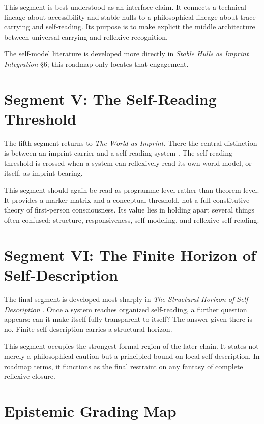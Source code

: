 \documentclass[12pt]{article}
\begin{document}
This segment is best understood as an interface claim. It connects a technical lineage about accessibility and stable hulls to a philosophical lineage about trace-carrying and self-reading. Its purpose is to make explicit the middle architecture between universal carrying and reflexive recognition.

The self-model literature is developed more directly in \emph{Stable Hulls as Imprint Integration} \S6; this roadmap only locates that engagement.

\section{Segment V: The Self-Reading Threshold}

The fifth segment returns to \emph{The World as Imprint}. There the central distinction is between an imprint-carrier and a self-reading system \cite{WorldImprint}. The self-reading threshold is crossed when a system can reflexively read its own world-model, or itself, as imprint-bearing.

This segment should again be read as programme-level rather than theorem-level. It provides a marker matrix and a conceptual threshold, not a full constitutive theory of first-person consciousness. Its value lies in holding apart several things often confused: structure, responsiveness, self-modeling, and reflexive self-reading.

\section{Segment VI: The Finite Horizon of Self-Description}

The final segment is developed most sharply in \emph{The Structural Horizon of Self-Description} \cite{PaperIII}. Once a system reaches organized self-reading, a further question appears: can it make itself fully transparent to itself? The answer given there is no. Finite self-description carries a structural horizon.

This segment occupies the strongest formal region of the later chain. It states not merely a philosophical caution but a principled bound on local self-description. In roadmap terms, it functions as the final restraint on any fantasy of complete reflexive closure.

\section{Epistemic Grading Map}
\end{document}
